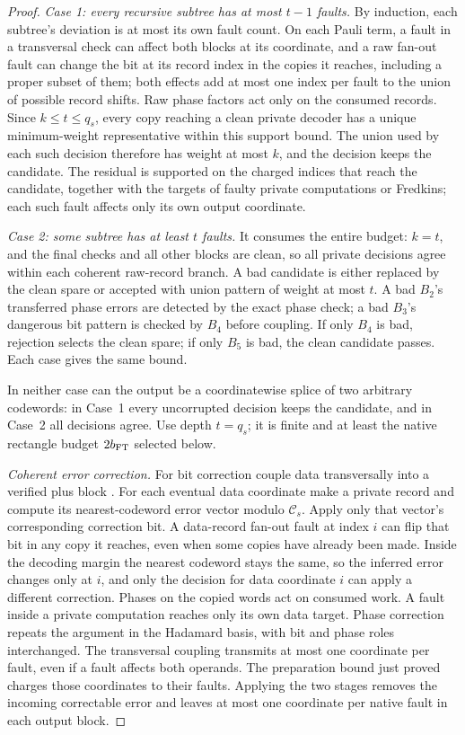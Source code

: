\begin{proof}
\emph{Case 1: every recursive subtree has at most \(t-1\) faults.} By induction, each subtree's deviation is at most its own fault count. On each Pauli term, a fault in a transversal check can affect both blocks at its coordinate, and a raw fan-out fault can change the bit at its record index in the copies it reaches, including a proper subset of them; both effects add at most one index per fault to the union of possible record shifts. Raw phase factors act only on the consumed records. Since \(k\le t\le q_s\), every copy reaching a clean private decoder has a unique minimum-weight representative within this support bound. The union used by each such decision therefore has weight at most \(k\), and the decision keeps the candidate. The residual is supported on the charged indices that reach the candidate, together with the targets of faulty private computations or Fredkins; each such fault affects only its own output coordinate.

\emph{Case 2: some subtree has at least \(t\) faults.} It consumes the entire budget: \(k=t\), and the final checks and all other blocks are clean, so all private decisions agree within each coherent raw-record branch. A bad candidate is either replaced by the clean spare or accepted with union pattern of weight at most \(t\). A bad \(B_2\)'s transferred phase errors are detected by the exact phase check; a bad \(B_3\)'s dangerous bit pattern is checked by \(B_4\) before coupling. If only \(B_4\) is bad, rejection selects the clean spare; if only \(B_5\) is bad, the clean candidate passes. Each case gives the same bound.

In neither case can the output be a coordinatewise splice of two arbitrary codewords: in Case~1 every uncorrupted decision keeps the candidate, and in Case~2 all decisions agree. Use depth \(t=q_s\); it is finite and at least the native rectangle budget \(2b_{\rm FT}\) selected below.

\smallskip\noindent
\emph{Coherent error correction.}
For bit correction couple data transversally into a verified plus
block \cite{Steane1997}. For each eventual data coordinate make a
private record and compute its nearest-codeword error vector modulo
\(\mathcal C_s\). Apply only that vector's corresponding correction bit.
A data-record fan-out fault at index \(i\) can flip that bit in any
copy it reaches, even when some copies have already been made. Inside
the decoding margin the nearest codeword stays the same, so the
inferred error changes only at \(i\), and only the decision for
data coordinate \(i\) can apply a different correction. Phases on
the copied words act on consumed work. A fault inside a private
computation reaches only its own data target. Phase correction repeats
the argument in the Hadamard basis, with bit and phase roles
interchanged. The transversal coupling transmits at most one
coordinate per fault, even if a fault affects both operands. The preparation bound just proved charges
those coordinates to their faults. Applying the two stages
removes the incoming correctable error and leaves at most one
coordinate per native fault in each output block.


\end{proof}
